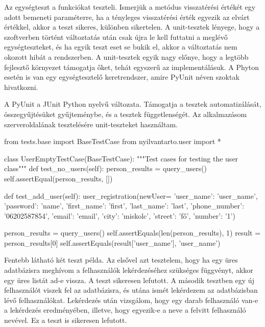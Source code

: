 Az egységteszt a funkciókat teszteli. Ismerjük a metódus visszatérési értékét egy adott bemeneti paraméterre, ha a tényleges visszatérési érték egyezik az elvárt értékkel, akkor a teszt sikeres, különben sikertelen. A unit-tesztek lényege, hogy a szoftverben történt változtatás után csak újra le kell futtatni a meglévő egységteszteket, és ha egyik teszt eset se bukik el, akkor a változtatás nem okozott hibát a rendszerben.
A unit-tesztek egyik nagy előnye, hogy a legtöbb fejlesztő környezet támogatja őket, tehát egyszerű az implementálásuk. A Phyton esetén is van egy egységtesztelő keretrendszer, amire PyUnit néven szoktak hivatkozni.

A PyUnit a JUnit Python nyelvű változata. Támogatja a tesztek automatizálását, összegyűjtésüket gyűjteménybe, és a tesztek függetlenségét. Az alkalmazásom szerveroldalának tesztelésére unit-teszteket használtam.

\begin{python}
 from tests.base import BaseTestCase
from nyilvantarto.user import *


class UserEmptyTestCase(BaseTestCase):
 """Test cases for testing the user class"""
    def test_no_users(self):
        person_results = query_users()
        self.assertEqual(person_results, [])

    def test_add_user(self):
        user_registration(newUser=
                          {'user_name': 'user_name', 'password': 'name', 'first_name': 'first', 'last_name': 'last',
                           'phone_number': '06202587854', 'email': 'email', 'city': 'miskolc', 'street': 'fő',
                           'number': '1'})

        person_results = query_users()
        self.assertEquals(len(person_results), 1)
        result = person_results[0]
        self.assertEquals(result['user_name'], 'user_name')

\end{python}

Fentebb látható két teszt példa. Az elsővel azt tesztelem, hogy ha egy üres adatbázisra meghívom a felhasználók lekérdezéséhez szükséges függvényt, akkor egy üres listát ad-e vissza. A teszt sikeresen lefutott. A második tesztben egy új felhasználót viszek fel az adatbázisra, és utána ismét lekérdezem az adatbázisban lévő felhasználókat. Lekérdezés után vizsgálom, hogy egy darab felhasználó van-e a lekérdezés eredményében, illetve, hogy egyezik-e a neve a felvitt felhasználó nevével. Ez a teszt is sikeresen lefutott.

